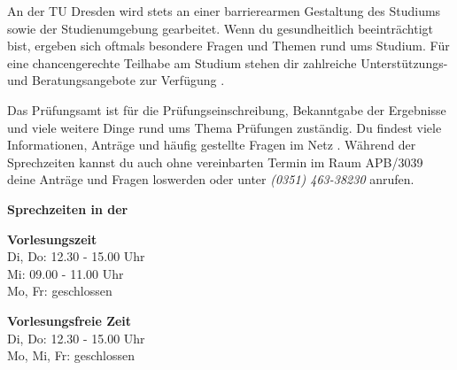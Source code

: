
An der TU Dresden wird stets an einer barrierearmen Gestaltung des Studiums sowie der Studienumgebung gearbeitet.
Wenn du gesundheitlich beeinträchtigt bist, ergeben sich oftmals besondere Fragen und Themen rund ums Studium. 
Für eine chancengerechte Teilhabe am Studium stehen dir zahlreiche Unterstützungs- und Beratungsangebote zur Verfügung .


\label{sec:pruefungsamt}
Das Prüfungsamt ist für die Prüfungseinschreibung, Bekanntgabe der Ergebnisse und viele weitere Dinge rund ums Thema Prüfungen zuständig. 
Du findest viele Informationen, Anträge und häufig gestellte Fragen im Netz . 
Während der Sprechzeiten kannst du auch ohne vereinbarten Termin im Raum APB/3039 deine Anträge und Fragen loswerden oder unter \textit{(0351) 463-38230} anrufen.

\textbf{Sprechzeiten in der}

\begin{multicols}{2}
\textbf{Vorlesungszeit} \\
Di, Do: 12.30 - 15.00 Uhr\\
Mi: 09.00 - 11.00 Uhr\\
Mo, Fr: geschlossen	

\textbf{Vorlesungsfreie Zeit} \\
Di, Do: 12.30 - 15.00 Uhr\\
Mo, Mi, Fr: geschlossen
\end{multicols}

